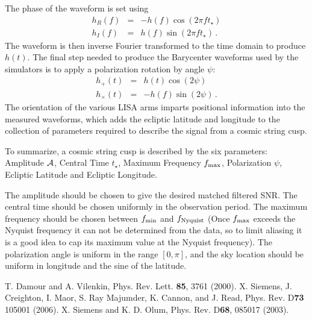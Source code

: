 \documentclass[12pt]{article}
\begin{document}
The phase of the waveform is set using
\begin{eqnarray}
h_R(f) & = & -h(f)\cos(2 \pi f t_\star) \nonumber \\
h_I(f) & = & h(f) \sin(2 \pi f t_\star) \, .
\end{eqnarray}
The waveform is then inverse Fourier transformed to the time domain
to produce $h(t)$.
The final step needed to produce the Barycenter waveforms used by
the simulators is to apply a polarization rotation by angle $\psi$:
\begin{eqnarray}
h_+(t) & = & h(t) \cos(2 \psi) \nonumber \\
h_\times(t) & = & -h(f) \sin(2 \psi) \, .
\end{eqnarray}
The orientation of the various LISA arms imparts positional information
into the measured waveforms, which adds the ecliptic latitude and longitude
to the collection of parameters required to describe the signal from
a cosmic string cusp.

To summarize, a cosmic string cusp is described by the six parameters:
Amplitude ${\cal A}$, Central Time $t_\star$, Maximum Frequency $f_{\rm max}$,
Polarization $\psi$, Ecliptic Latitude and Ecliptic Longitude.

The amplitude should be chosen to give the desired matched filtered SNR.
The central time should be chosen uniformly in the observation period.
The maximum frequency should be chosen between $f_{\rm min}$ and
$f_{\rm Nyquist}$ (Once $f_{\rm max}$ exceeds the Nyquist frequency it
can not be determined from the data, so to limit aliasing it is a good
idea to cap its maximum value at the Nyquist frequency). The polarization
angle is uniform in the range $[0,\pi]$, and the sky location should be
uniform in longitude and the sine of the latitude.


\begin{thebibliography}{99}

 T. Damour and A. Vilenkin, Phys. Rev. Lett. {\bf 85}, 3761 (2000).
 X. Siemens, J. Creighton, I. Maor, S. Ray Majumder,
K. Cannon, and J. Read, Phys. Rev. D{\bf 73} 105001 (2006).
 X. Siemens and K. D. Olum, Phys. Rev. D{\bf 68}, 085017 (2003).

\end{thebibliography}
\end{document}
